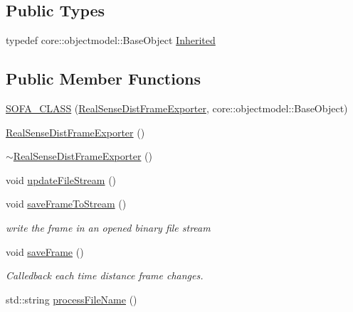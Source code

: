 \subsection*{Public Types}
\begin{DoxyCompactItemize}
\item 
typedef core\+::objectmodel\+::\+Base\+Object \hyperlink{classsofa_1_1rgbdtracking_1_1_real_sense_dist_frame_exporter_a3d5e841c18a10910a89dcaa8fafcaa53}{Inherited}
\end{DoxyCompactItemize}
\subsection*{Public Member Functions}
\begin{DoxyCompactItemize}
\item 
\hyperlink{classsofa_1_1rgbdtracking_1_1_real_sense_dist_frame_exporter_a4e09a848d4afe49248391a934c051eb5}{S\+O\+F\+A\+\_\+\+C\+L\+A\+SS} (\hyperlink{classsofa_1_1rgbdtracking_1_1_real_sense_dist_frame_exporter}{Real\+Sense\+Dist\+Frame\+Exporter}, core\+::objectmodel\+::\+Base\+Object)
\item 
\hyperlink{classsofa_1_1rgbdtracking_1_1_real_sense_dist_frame_exporter_a662756cddb128dfee5e6b7ceff636e68}{Real\+Sense\+Dist\+Frame\+Exporter} ()
\item 
\hyperlink{classsofa_1_1rgbdtracking_1_1_real_sense_dist_frame_exporter_af42acfd51a513b13ee2f70e6f4651b2e}{$\sim$\+Real\+Sense\+Dist\+Frame\+Exporter} ()
\item 
void \hyperlink{classsofa_1_1rgbdtracking_1_1_real_sense_dist_frame_exporter_af0422eedd90f9e7b8c5b17c33994a39c}{update\+File\+Stream} ()
\item 
void \hyperlink{classsofa_1_1rgbdtracking_1_1_real_sense_dist_frame_exporter_a97e36488ae57725cf05f28c1d70b18a3}{save\+Frame\+To\+Stream} ()
\begin{DoxyCompactList}\small\item\em write the frame in an opened binary file stream \end{DoxyCompactList}\item 
void \hyperlink{classsofa_1_1rgbdtracking_1_1_real_sense_dist_frame_exporter_ab788c5084fff8f6e8ee0d7b000af871b}{save\+Frame} ()
\begin{DoxyCompactList}\small\item\em Calledback each time distance frame changes. \end{DoxyCompactList}\item 
std\+::string \hyperlink{classsofa_1_1rgbdtracking_1_1_real_sense_dist_frame_exporter_aa5ebbe273df7d13fe9a8f648aa624d1c}{process\+File\+Name} ()
\end{DoxyCompactItemize}

